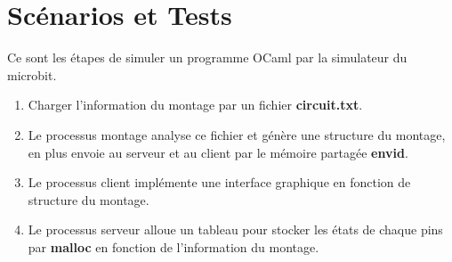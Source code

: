 \documentclass[14px]{article}
\begin{document}
\section{Scénarios et Tests}
Ce sont les étapes de simuler un programme OCaml par la simulateur du microbit.
\begin{enumerate}
	\item Charger l'information du montage par un fichier \textbf{circuit.txt}.
	\item Le processus montage analyse ce fichier et génère une structure du montage, en plus envoie au serveur et au client par le mémoire partagée \textbf{envid}.
	\item Le processus client implémente une interface graphique en fonction de structure du montage.
	\item Le processus serveur alloue un tableau pour stocker les états de chaque pins par \textbf{malloc} en fonction de l'information du montage.
	\begin{figure}[htbp]
		\centering
\end{figure}
\end{enumerate}
\end{document}
